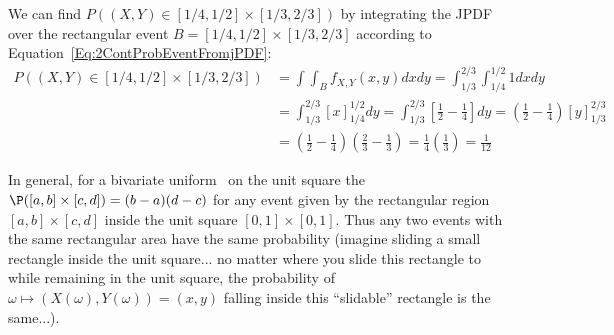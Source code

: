 \begin{example}
\item We can find $P\left( (X,Y) \in [1/4,1/2]\times[1/3,2/3] \right)$ by integrating the JPDF over the rectangular event $B=[1/4,1/2]\times[1/3,2/3]$ according to Equation~\eqref{Eq:2ContProbEventFromjPDF}:
{\small
\begin{align*}
P\left( (X,Y) \in [1/4,1/2]\times[1/3,2/3] \right)
&=\int\int_B f_{X,Y}(x,y)dxdy
=\int_{1/3}^{2/3}\int_{1/4}^{1/2} 1 dx dy\\
&=\int_{1/3}^{2/3} \left[ x \right]_{1/4}^{1/2}  dy
=\int_{1/3}^{2/3} \left[ \frac{1}{2}-\frac{1}{4} \right]  dy
=\left(\frac{1}{2}-\frac{1}{4}\right)\left[ y \right]_{1/3}^{2/3}\\ 
&=\left(\frac{1}{2}-\frac{1}{4}\right)\left( \frac{2}{3}-\frac{1}{3} \right) 
=\frac{1}{4} \left( \frac{1}{3} \right) =\frac{1}{12}
\end{align*}
}
\ee

In general, for a bivariate uniform \rv~on the unit square the $\P([a,b]\times[c,d]) = (b-a)(d-c)$ for any event given by the rectangular region $[a,b]\times[c,d]$ inside the unit square $[0,1]\times[0,1]$.  
Thus any two events with the same rectangular area have the same probability (imagine sliding a small rectangle inside the unit square... no matter where you slide this rectangle to while remaining in the unit square, the probability of $\omega \mapsto (X(\omega),Y(\omega))=(x,y)$ falling inside this ``slidable'' rectangle is the same...).
\end{example}
 

